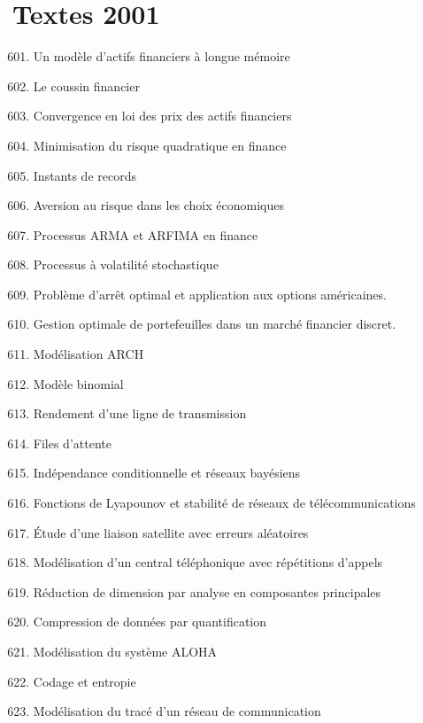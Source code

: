 {{%
\section{Textes 2001}
%

\begin{enumerate}
\setcounter{enumi}{600}
\item \label{T-601} Un modèle d'actifs financiers à longue mémoire
\item \label{T-602} Le coussin financier
\item \label{T-603} Convergence en loi des prix des actifs financiers
\item \label{T-604} Minimisation du risque quadratique en finance
\item \label{T-605} Instants de records
\item \label{T-606} Aversion au risque dans les choix économiques
\item \label{T-607} Processus ARMA et ARFIMA en finance
\item \label{T-608} Processus à volatilité stochastique
\item \label{T-609} Problème d'arrêt optimal et application aux options américaines.
\item \label{T-610} Gestion optimale de portefeuilles dans un marché financier discret.
\item \label{T-611} Modélisation ARCH
\item \label{T-612} Modèle binomial
\item \label{T-613} Rendement d'une ligne de transmission
\item \label{T-614} Files d'attente
\item \label{T-615} Indépendance conditionnelle et réseaux bayésiens
\item \label{T-616} Fonctions de Lyapounov et stabilité de réseaux de télécommunications
\item \label{T-617} Étude d'une liaison satellite avec erreurs aléatoires
\item \label{T-618} Modélisation d'un central téléphonique avec répétitions d'appels
\item \label{T-619} Réduction de dimension par analyse en composantes principales
\item \label{T-620} Compression de données par quantification
\item \label{T-621} Modélisation du système ALOHA
\item \label{T-622} Codage et entropie
\item \label{T-623} Modélisation du tracé d'un réseau de communication

\end{enumerate}}}
